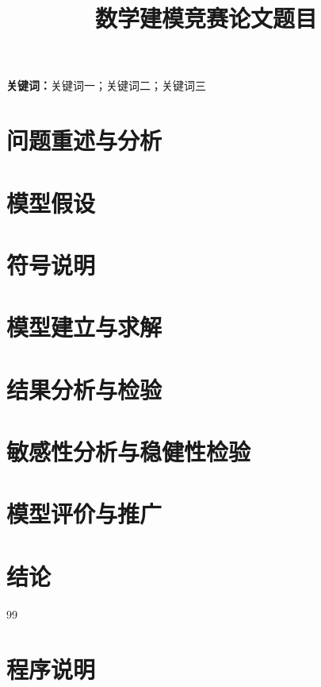 \documentclass[UTF8,12pt,a4paper]{ctexart}
\title{数学建模竞赛论文题目}
\author{}
\date{}
\newcommand{\keywords}[1]{\par\noindent\textbf{关键词：}#1}
\begin{document}
\maketitle

\begin{abstract}
\end{abstract}
\keywords{关键词一；关键词二；关键词三}

\newpage
\tableofcontents
\listoffigures
\newpage

\section{问题重述与分析}

\section{模型假设}

\section{符号说明}

\section{模型建立与求解}

\section{结果分析与检验}

\section{敏感性分析与稳健性检验}

\section{模型评价与推广}

\section{结论}

\begin{thebibliography}{99}
\end{thebibliography}

\appendix
\section{程序说明}
\end{document}
